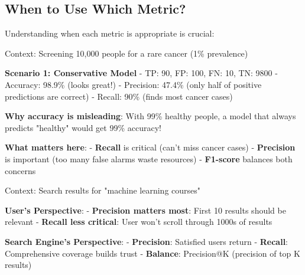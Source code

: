 \documentclass{article}
\newcounter{example}
\begin{document}
\begin{center}
\end{center}

\subsection{When to Use Which Metric?}

Understanding when each metric is appropriate is crucial:

\begin{tcolorbox}[colback=yellow!5!white,colframe=yellow!75!black,title=Example \stepcounter{example}\#\theexample: Medical Diagnosis - Cancer Detection]
Context: Screening 10,000 people for a rare cancer (1\% prevalence)

\textbf{Scenario 1: Conservative Model}
- TP: 90, FP: 100, FN: 10, TN: 9800
- Accuracy: 98.9\% (looks great!)
- Precision: 47.4\% (only half of positive predictions are correct)
- Recall: 90\% (finds most cancer cases)

\textbf{Why accuracy is misleading}: With 99\% healthy people, a model that always predicts "healthy" would get 99\% accuracy!

\textbf{What matters here}:
- \textbf{Recall} is critical (can't miss cancer cases)
- \textbf{Precision} is important (too many false alarms waste resources)
- \textbf{F1-score} balances both concerns
\end{tcolorbox}

\begin{tcolorbox}[colback=cyan!5!white,colframe=cyan!75!black,title=Example \stepcounter{example}\#\theexample: Information Retrieval - Search Engine]
Context: Search results for "machine learning courses"

\textbf{User's Perspective}:
- \textbf{Precision matters most}: First 10 results should be relevant
- \textbf{Recall less critical}: User won't scroll through 1000s of results

\textbf{Search Engine's Perspective}:
- \textbf{Precision}: Satisfied users return
- \textbf{Recall}: Comprehensive coverage builds trust
- \textbf{Balance}: Precision@K (precision of top K results)
\end{tcolorbox}
\end{document}
